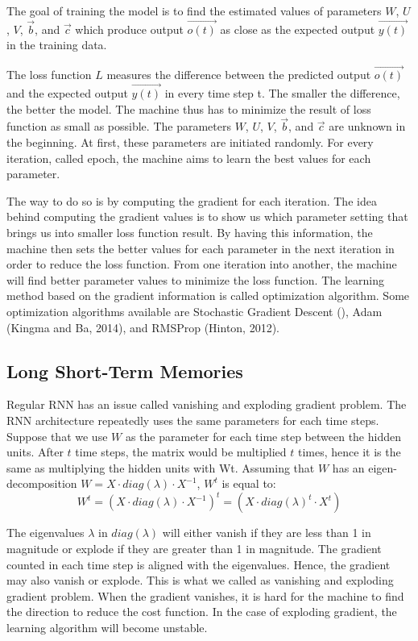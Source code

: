 The goal of training the model is to find the estimated values of parameters $W$, $U$, $V$, $\vec{b}$, and $\vec{c}$ which produce output $\vec{o(t)}$ as close as the expected output $\vec{y(t)}$ in the training data. 

The loss function $L$ measures the difference between the predicted output $\vec{o(t)}$ and the expected output $\vec{y(t)}$ in every time step t. The smaller the difference, the better the model. The machine thus has to minimize the result of loss function as small as possible. The parameters $W$, $U$, $V$, $\vec{b}$, and $\vec{c}$ are unknown in the beginning. At first, these parameters are initiated randomly. For every iteration, called epoch, the machine aims to learn the best values for each parameter.

The way to do so is by computing the gradient for each iteration. The idea behind computing the gradient values is to show us which parameter setting that brings us into smaller loss function result. By having this information, the machine then sets the better values for each parameter in the next iteration in order to reduce the loss function. From one iteration into another, the machine will find better parameter values to minimize the loss function. The learning method based on the gradient information is called optimization algorithm. Some optimization algorithms available are Stochastic Gradient Descent (), Adam (Kingma and Ba, 2014), and RMSProp (Hinton, 2012).

\subsection{Long Short-Term Memories}
Regular RNN has an issue called vanishing and exploding gradient problem. The RNN architecture repeatedly uses the same parameters for each time steps. Suppose that we use $W$ as the parameter for each time step between the hidden units. After $t$ time steps, the matrix would be multiplied $t$ times, hence it is the same as multiplying the hidden units with Wt. Assuming that $W$ has an eigen-decomposition $W = X \cdot diag(\lambda) \cdot X^{-1}$, $W^{t}$ is equal to:
\begin{equation}
W^{t} = (X \cdot diag(\lambda) \cdot X^{-1})^{t} = (X \cdot diag(\lambda)^{t} \cdot X^{t})
\end{equation}

The eigenvalues $\lambda$ in $diag(\lambda)$ will either vanish if they are less than 1 in magnitude or explode if they are greater than 1 in magnitude. The gradient counted in each time step is aligned with the eigenvalues. Hence, the gradient may also vanish or explode. This is what we called as vanishing and exploding gradient problem. When the gradient vanishes, it is hard for the machine to find the direction to reduce the cost function. In the case of exploding gradient, the learning algorithm will become unstable.

